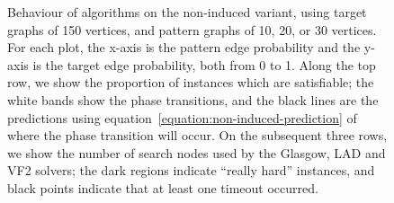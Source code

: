 \documentclass[twoside,11pt]{article}
\begin{document}
\begin{figure}[tb]

    \caption{Behaviour of algorithms on the non-induced variant, using target graphs of 150
        vertices, and pattern graphs of 10, 20, or 30 vertices. For each plot, the x-axis is the
        pattern edge probability and the y-axis is the target edge probability, both from 0 to 1.
        Along the top row, we show the proportion of instances which are satisfiable; the white
        bands show the phase transitions, and the black lines are the predictions using
        equation~\eqref{equation:non-induced-prediction} of where the
        phase transition will occur. On the subsequent three rows, we show the number of search nodes used by the
        Glasgow, LAD and VF2 solvers; the dark regions indicate ``really hard'' instances, and black
        points indicate that at least one timeout occurred.}
    \label{figure:non-induced}
\end{figure}
\end{document}
